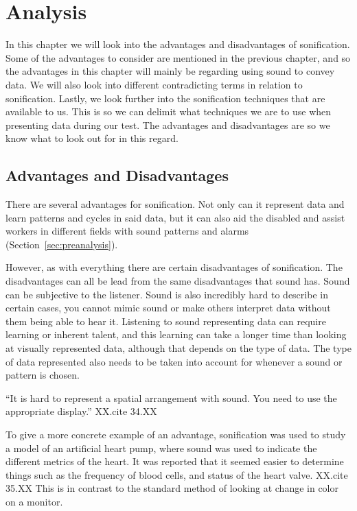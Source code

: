 
\section{Analysis} %
\label{sec:analysis}

In this chapter we will look into the advantages and disadvantages of sonification. Some of the advantages to consider are mentioned in the previous chapter, and so the advantages in this chapter will mainly be regarding using sound to convey data. We will also look into different contradicting terms in relation to sonification. Lastly, we look further into the sonification techniques that are available to us. This is so we can delimit what techniques we are to use when presenting data during our test. The advantages and disadvantages are so we know what to look out for in this regard.

\FloatBarrier
\subsection{Advantages and Disadvantages} %
\label{sub:advantages_and_disadvantages_of_sonification}

There are several advantages for sonification. Not only can it represent data and learn patterns and cycles in said data, but it can also aid the disabled and assist workers in different fields with sound patterns and alarms (Section~\ref{sec:preanalysis}).

However, as with everything there are certain disadvantages of sonification. The disadvantages can all be lead from the same disadvantages that sound has. Sound can be subjective to the listener. Sound is also incredibly hard to describe in certain cases, you cannot mimic sound or make others interpret data without them being able to hear it. Listening to sound representing data can require learning or inherent talent, and this learning can take a longer time than looking at visually represented data, although that depends on the type of data. The type of data represented also needs to be taken into account for whenever a sound or pattern is chosen. 


\enquote{It is hard to represent a spatial arrangement with sound. You need to use the appropriate display.} XX.cite 34.XX

To give a more concrete example of an advantage, sonification was used to study a model of an artificial heart pump, where sound was used to indicate the different metrics of the heart. It was reported that it seemed easier to determine things such as the frequency of blood cells, and status of the heart valve. XX.cite 35.XX
This is in contrast to the standard method of looking at change in color on a monitor. 

